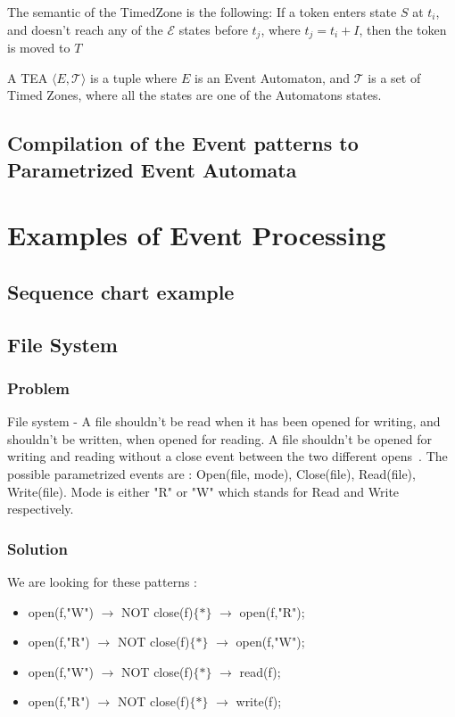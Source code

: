 			The semantic of the TimedZone is the following: 
				If a token enters state $S$ at $t_i$, and doesn't reach any of the $\mathcal{E}$ states before $t_j$,
				where $t_j = t_i + I$, then the token is moved to $T$
				
			\begin{dfn}
				A TEA
				$\langle E,\mathcal{T} \rangle$ is a tuple where $E$ is an Event Automaton, and $\mathcal{T}$ is a set of Timed Zones, where all the states are one of the 
				Automatons states.
			\end{dfn}

		\subsection{Compilation of the Event patterns to Parametrized Event Automata}
			
			
			
	\section{Examples of Event Processing}
 
		\subsection{Sequence chart example}
 
		\subsection{File System}
			\subsubsection{Problem}
				File system - A file shouldn't be read when it has been opened for writing, and shouldn't be written, when opened for reading. 
				A file shouldn't be opened for writing and reading without a close event between the two different opens~\citep{marq}.
				The possible parametrized events are : 
				Open(file, mode), 
				Close(file), 
				Read(file), 
				Write(file). 
				Mode is either "R" or "W" which stands for Read and Write respectively.
			\subsubsection{Solution}
				We are looking for these patterns :

				\begin{itemize}
					\item open(f,"W") $\rightarrow$ NOT close(f)$\{\ast\}$ $\rightarrow$ open(f,"R");
					\item open(f,"R") $\rightarrow$ NOT close(f)$\{\ast\}$ $\rightarrow$ open(f,"W");
					\item open(f,"W") $\rightarrow$ NOT close(f)$\{\ast\}$ $\rightarrow$ read(f);
					\item open(f,"R") $\rightarrow$ NOT close(f)$\{\ast\}$ $\rightarrow$ write(f);
				\end{itemize}

